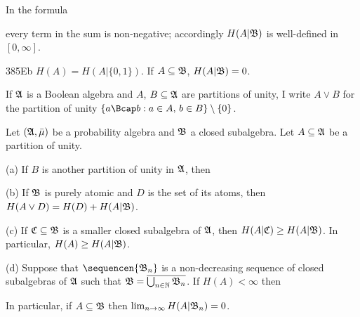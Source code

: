      
\noindent{}
     
In the formula
     
     
\noindent{}every term in the sum is non-negative;
accordingly $H(A|\frak B)$ is well-defined in $[0,\infty]$.
     
\spheader 385Eb $H(A)=H(A|\{0,1\})$.   If
$A\subseteq\frak B$, $H(A|\frak B)=0$.
     
If $\frak A$ is a Boolean algebra and $A$,
$B\subseteq\frak A$ are partitions of unity, I write $A\vee B$ for the
partition of unity $\{a\Bcap b:a\in A,\,b\in B\}\setminus\{0\}$.
     
Let $(\frak A,\bar\mu)$ be a probability algebra
and $\frak B$ a closed subalgebra.   Let $A\subseteq\frak A$ be a
partition of unity.
     
(a) If $B$ is another partition of unity in $\frak A$, then
     
     
(b) If $\frak B$ is purely atomic and $D$ is the set of its atoms, then
$H(A\vee D)=H(D)+H(A|\frak B)$.
     
(c) If $\frak C\subseteq\frak B$ is a smaller closed subalgebra of
$\frak A$, then $H(A|\frak C)\ge H(A|\frak B)$.   In particular,
$H(A)\ge H(A|\frak B)$.
     
(d) Suppose that $\sequencen{\frak B_n}$ is a non-decreasing sequence of
closed subalgebras of $\frak A$ such that
$\frak B=\overline{\bigcup_{n\in\Bbb N}\frak B_n}$.   If $H(A)<\infty$
then
     
     
\noindent In particular, if $A\subseteq\frak B$ then
$\lim_{n\to\infty}H(A|\frak B_n)=0$.
     
